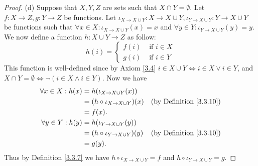 \begin{proof}{(d)}
    Suppose that \(X, Y, Z\) are sets such that \(X \cap Y = \emptyset\).
    Let \(f : X \to Z, g : Y \to Z\) be functions.
    Let \(\iota_{X \to X \cup Y} : X \to X \cup Y, \iota_{Y \to X \cup Y} : Y \to X \cup Y\) be functions such that \(\forall x \in X : \iota_{X \to X \cup Y}(x) = x\) and \(\forall y \in Y : \iota_{Y \to X \cup Y}(y) = y\).
    We now define a function \(h : X \cup Y \to Z\) as follow:
    \[
        h(i) = \begin{cases}
            f(i) & \text{ if } i \in X \\
            g(i) & \text{ if } i \in Y
        \end{cases}
    \]
    This function is well-defined since by Axiom \ref{3.4} \(i \in X \cup Y \iff i \in X \lor i \in Y\), and \(X \cap Y = \emptyset \iff \lnot(i \in X \land i \in Y)\).
    Now we have
    \begin{align*}
        \forall x \in X : h(x) & = h(\iota_{X \to X \cup Y}(x))                                              \\
                               & = (h \circ \iota_{X \to X \cup Y})(x) & \text{(by Definition \ref{3.3.10})} \\
                               & = f(x).                                                                     \\
        \forall y \in Y : h(y) & = h(\iota_{Y \to X \cup Y}(y))                                              \\
                               & = (h \circ \iota_{Y \to X \cup Y})(y) & \text{(by Definition \ref{3.3.10})} \\
                               & = g(y).
    \end{align*}
    Thus by Definition \ref{3.3.7} we have \(h \circ \iota_{X \to X \cup Y} = f\) and \(h \circ \iota_{Y \to X \cup Y} = g\).


\end{proof}

